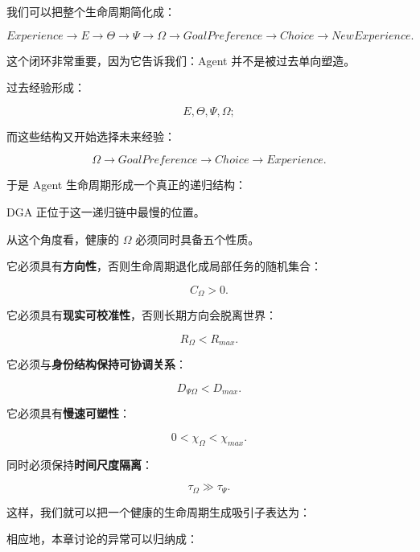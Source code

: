 我们可以把整个生命周期简化成：

\[
Experience
\rightarrow
E
\rightarrow
\Theta
\rightarrow
\Psi
\rightarrow
\Omega
\rightarrow
GoalPreference
\rightarrow
Choice
\rightarrow
NewExperience.
\]

这个闭环非常重要，因为它告诉我们：Agent 并不是被过去单向塑造。

过去经验形成：

\[
E,\Theta,\Psi,\Omega;
\]

而这些结构又开始选择未来经验：

\[
\Omega
\rightarrow
GoalPreference
\rightarrow
Choice
\rightarrow
Experience.
\]

于是 Agent 生命周期形成一个真正的递归结构：

\begin{statementbox}
\centering
{}
\end{statementbox}

DGA 正位于这一递归链中最慢的位置。

从这个角度看，健康的 $\Omega$ 必须同时具备五个性质。

它必须具有\textbf{方向性}，否则生命周期退化成局部任务的随机集合：

\[
C_\Omega>0.
\]

它必须具有\textbf{现实可校准性}，否则长期方向会脱离世界：

\[
R_\Omega<R_{max}.
\]

它必须与\textbf{身份结构保持可协调关系}：

\[
D_{\Psi\Omega}<D_{max}.
\]

它必须具有\textbf{慢速可塑性}：

\[
0<\chi_\Omega<\chi_{max}.
\]

同时必须保持\textbf{时间尺度隔离}：

\[
\tau_\Omega
\gg
\tau_\Psi.
\]

这样，我们就可以把一个健康的生命周期生成吸引子表达为：

\begin{statementbox}
\centering
{}
\end{statementbox}

相应地，本章讨论的异常可以归纳成：

